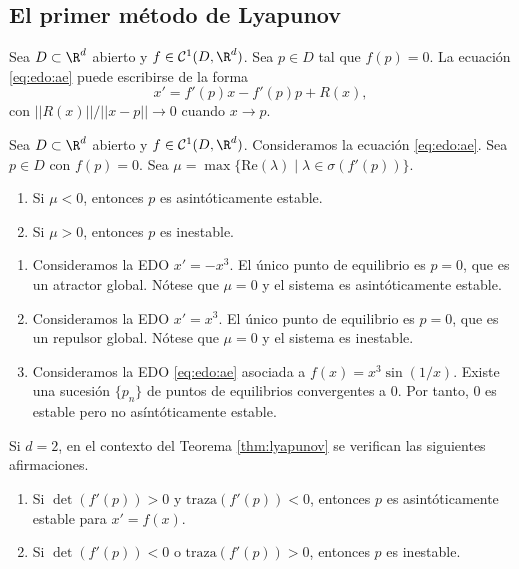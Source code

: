 \subsection{El primer método de Lyapunov}

Sea $D \subset \R^d$ abierto y $f \in \mathcal{C}^1(D, \R^d)$. Sea $p \in D$ tal que $f(p) = 0$. La
ecuación \eqref{eq:edo:ae} puede escribirse de la forma
\begin{equation}
  \label{eq:3}
  x' = f'(p)x - f'(p)p + R(x),
\end{equation}
con $||R(x)|| / ||x-p|| \to 0$ cuando $x\to p$.

\begin{theorem}
  \label{thm:lyapunov}
  Sea $D \subset \R^d$ abierto y $f \in \mathcal{C}^1(D, \R^d)$. Consideramos la ecuación
  \eqref{eq:edo:ae}.  Sea $p \in D$ con $f(p) = 0$. Sea
  $\mu = \max \{\mathrm{Re}(\lambda) \mid \lambda \in \sigma(f'(p))\}$.
  \begin{enumerate}
  \item Si $\mu < 0$, entonces $p$ es asintóticamente estable.
  \item Si $\mu > 0$, entonces $p$ es inestable.
  \end{enumerate}
\end{theorem}

\begin{ex}
  
  \begin{enumerate}
  \item Consideramos la EDO $x' = -x^3$. El único punto de equilibrio es $p = 0$, que es un atractor
    global. Nótese que $\mu = 0$ y el sistema es asintóticamente estable.
  \item Consideramos la EDO $x' = x^3$. El único punto de equilibrio es $p = 0$, que es un repulsor
    global. Nótese que $\mu = 0$ y el sistema es inestable.
  \item Consideramos la EDO \eqref{eq:edo:ae} asociada a $f(x) = x^3 \sin(1/x)$. Existe una sucesión
    $\{p_n\}$ de puntos de equilibrios convergentes a $0$. Por tanto, $0$ es estable pero no
    asíntóticamente estable.
  \end{enumerate}
\end{ex}

\begin{corollary}
  Si $d = 2$, en el contexto del Teorema \ref{thm:lyapunov} se verifican las siguientes
  afirmaciones.
  \begin{enumerate}
  \item Si $\det(f'(p)) > 0$ y $\mathrm{traza}(f'(p)) < 0$, entonces $p$ es asintóticamente estable
    para $x' = f(x)$.
  \item Si $\det(f'(p)) < 0$ o $\mathrm{traza}(f'(p)) > 0$, entonces $p$ es inestable.
  \end{enumerate}
\end{corollary}

